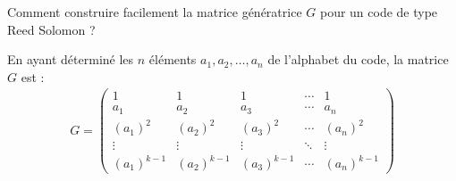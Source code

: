\documentclass[12pt]{article}
\newcommand*{\xfield}[1]{\begin{mdframed}\centering #1\end{mdframed}\bigskip}
\newenvironment{note}{}{}
\begin{document}
\begin{note}
	\xfield{Comment construire facilement la matrice génératrice $G$ pour un code de type Reed Solomon ?}
	\xfield{En ayant déterminé les $n$ éléments $a_1,a_2,\hdots,a_n$ de l'alphabet du code, la matrice $G$ est :
	\begin{align*}
	G = \begin{pmatrix}
	1 & 1 & 1 & \cdots & 1\\
	a_1 & a_2 & a_3 & \cdots & a_n\\
	(a_1)^2 & (a_2)^2 & (a_3)^2 & \cdots & (a_n)^2\\
	\vdots & \vdots & \vdots & \ddots & \vdots\\
	(a_1)^{k-1} & (a_2)^{k-1} & (a_3)^{k-1} & \cdots & (a_n)^{k-1}
	\end{pmatrix}
	\end{align*} }
\end{note}
\end{document}
